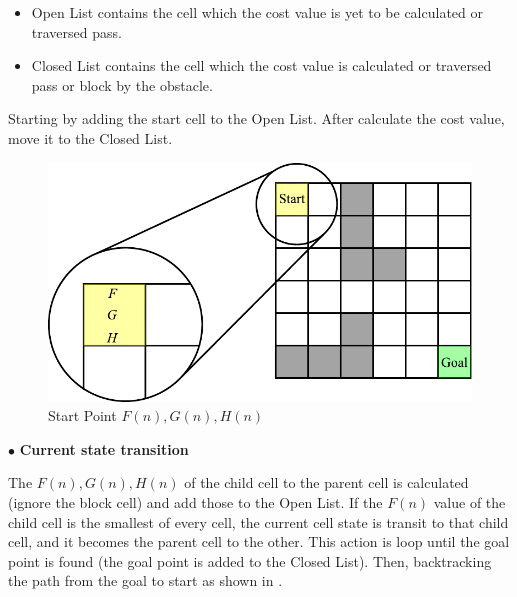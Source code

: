 \begin{itemize}
	\item Open List contains the cell which the cost value is yet to be calculated or traversed pass.
	\item Closed List contains the cell which the cost value is calculated or traversed pass or block by the obstacle.
\end{itemize}

Starting by adding the start cell to the Open List. After calculate the cost value, move it to the Closed List.

\break
\begin{figure}[ht]
	\centering
	\includegraphics[scale=0.85]{images/imagess/6pp-start-cost.pdf}
	\caption{Start Point $F(n),G(n),H(n)$}
	\label{fig:Start Point F,G,H}
\end{figure}

$\bullet$ \textbf{Current state transition} \par
\hspace{1.27cm}
The $F(n),G(n),H(n)$ of the child cell to the parent cell is calculated (ignore the block cell) and add those to the Open List. If the $F(n)$ value of the child cell is the smallest of every cell, the current cell state is transit to that child cell, and it becomes the parent cell to the other. This action is loop until the goal point is found (the goal point is added to the Closed List). Then, backtracking the path from the goal to start as shown in \textbf{\figureautorefname{ \ref{fig:Current state transition}}}.\par

